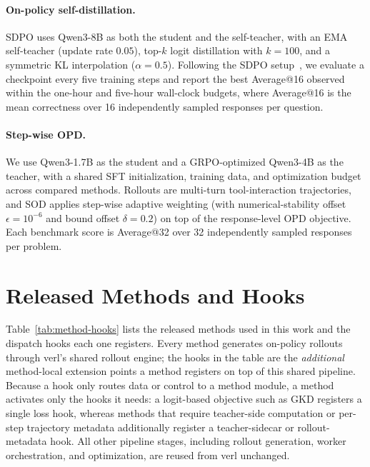 \paragraph{On-policy self-distillation.}
SDPO uses Qwen3-8B as both the student and the self-teacher, with an EMA
self-teacher (update rate $0.05$), top-$k$ logit distillation with $k=100$, and
a symmetric KL interpolation ($\alpha=0.5$). Following the SDPO
setup~\citep{hubotter2026sdpo}, we evaluate a checkpoint every five training
steps and report the best Average@16 observed within the one-hour and five-hour
wall-clock budgets, where Average@16 is the mean correctness over 16
independently sampled responses per question.

\paragraph{Step-wise OPD.}
We use Qwen3-1.7B as the student and a GRPO-optimized Qwen3-4B as the teacher,
with a shared SFT initialization, training data, and optimization budget across
compared methods. Rollouts are multi-turn tool-interaction trajectories, and
SOD applies step-wise adaptive weighting (with numerical-stability offset
$\epsilon=10^{-6}$ and bound offset $\delta=0.2$) on top of the response-level
OPD objective. Each benchmark score is Average@32 over 32 independently sampled
responses per problem.

\section{Released Methods and Hooks}
\label{app:method-hooks}

Table~\ref{tab:method-hooks} lists the released methods used in this work and
the dispatch hooks each one registers. Every method generates on-policy
rollouts through verl's shared rollout engine; the hooks in the table are the
\emph{additional} method-local extension points a method registers on top of
this shared pipeline. Because a hook only routes data or control to a method
module, a method activates only the hooks it needs: a logit-based objective
such as GKD registers a single loss hook, whereas methods that require
teacher-side computation or per-step trajectory metadata additionally register
a teacher-sidecar or rollout-metadata hook. All other pipeline stages,
including rollout generation, worker orchestration, and optimization, are
reused from verl unchanged.

